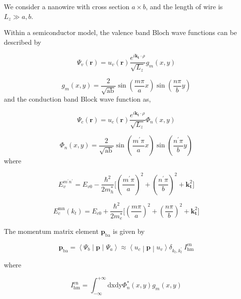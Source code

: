 We consider a nanowire with cross section \(a \times b\), and the
length of wire is \(L_{z} \gg a,b\).

Within a semiconductor model, the valence band Bloch wave functions can
be described by

\begin{equation}
\Psi_{v}\left( \bm{r} \right) = u_{v}(\bm{r})\frac{e^{i\bm{k}_{\bm{t}} \cdot \rho}}{\sqrt{L_{z}}}g_{m}(x,y)
\end{equation}

\begin{equation}
g_{m}\left( x,y \right) = \frac{2}{\sqrt{\text{ab}}}\sin{(\frac{m\pi}{a}x)}\sin{(\frac{n\pi}{b}y)}
\end{equation}
and the conduction band Block wave function as,

\begin{equation}
\Psi_{c}\left( \bm{r} \right) = u_{c}(\bm{r})\frac{e^{i\bm{k}_{\bm{t}} \cdot \rho}}{\sqrt{L_{z}}}\Phi_{n}(x,y)
\end{equation}

\begin{equation}
\Phi_{n}(x,y) = \frac{2}{\sqrt{\text{ab}}}\sin{(\frac{m^{'}\pi}{a}x)\sin{(\frac{n^{'}\pi}{b}y)}}
\end{equation}
where

\begin{equation}
E_{v}^{m^{'}n^{'}} = E_{v0} - \frac{\hbar^{2}}{2m_{h}^{*}}\lbrack\left( \frac{m^{'}\pi}{a} \right)^{2} + \left( \frac{n^{'}\pi}{b} \right)^{2} + \bm{k}_{\bm{t}}^{2}\rbrack
\end{equation}

\begin{equation}
E_{c}^{\text{mn}}\left( k_{t} \right) = E_{c0} + \frac{\hbar^{2}}{2m_{e}^{*}}\lbrack\left( \frac{m\pi}{a} \right)^{2} + \left( \frac{n\pi}{b} \right)^{2} + \bm{k}_{\bm{t}}^{2}\rbrack
\end{equation}

The momentum matrix element \(\bm{p}_{\text{ba}}\) is given by

\begin{equation}
\bm{p}_{\text{ba}}\bm{=}\left\langle \Psi_{b} \middle| \bm{p} \middle| \Psi_{a} \right\rangle \approx \left\langle u_{c} \middle| \bm{p} \middle| u_{v} \right\rangle\delta_{k_{t},k_{t}^{'}}\ I_{\text{hm}}^{\text{en}}
\end{equation}

where

\begin{equation}
I_{\text{hm}}^{\text{en}} = \int_{- \infty}^{+ \infty}{\text{dxdy}\Phi_{n}^{\ast}(x,y)}g_{m}(x,y)
\end{equation}

